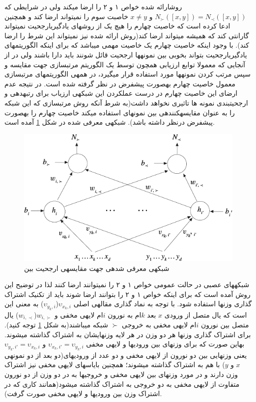 \documentclass{CSICC2016}
\renewcommand{\ }{\hspace{0em}}
\newcommand{\مق}{\lr}
\renewcommand{\یا}{یادگیری\ ارجحیت }
\newcommand{\یم}{یادگیری\ ماشین }
\renewcommand{\تر}{تابع رتبه\ بند }
\newcommand{\ار}{ارجحیت }
\renewcommand{\|}[1][.3em]{\hspace{#1}|\hspace{#1}}
\renewcommand{\,}[1][.3em]{,\hspace{#1}}
\newcommand{\outOne}{N_{\succ}}
\newcommand{\outTwo}{N_{\prec}}
\newcommand{\outOneXY}{\outOne([x,y])}
\newcommand{\outTwoXY}{\outTwo([x,y])}
\begin{document}
روش\ ارائه شده خواص ۱ و ۲ را ارضا می\ کند ولی در شرایطی که
$\outOneXY = \outTwoXY$ و $x \neq y$
خاصبت سوم را نمی\ تواند ارضا کند و همچنین ادعا کرده است که خاصیت چهارم را هیچ یک از روش\ های \یا نمی\ تواند گارانتی کند که همیشه می\ تواند ارضا کند(روش ارائه شده نیز نمی\ تواند این شرط را ارضا کند). با وجود اینکه خاصیت چهارم یک خاصیت مهمی می\ باشد که برای اینکه الگوریتم\ های \یا بتواند بخوبی بین نمونه\ ها ارجحیت قائل شونند باید دارا باشند ولی در از آن\ جایی که معمولا توابع ارزیابی همچون \مق{CmpNN} توسط یک الگوریتم مرتب\ سازی جهت مقایسه و سپس مرتب کردن نمونه\ ها مورد استفاده قرار می\ گیرد، در همه\ ی الگوریتم\ های مرتب\ سازی معمول خاصیت چهارم به\ صورت پیش\ فرض در نظر گرفته شده است. در نتیجه عدم ارضای این خاصیت چهارم در درست عمل\ کردن این شبکه\ ی ارزیاب برای رتبه\ دهی و ارجحیت\ بندی نمونه ها تاثیری نخواهد داشت(به شرط آن\ که روش مرتب\ سازی که این شبکه را به عنوان مقایسه\ کننده\ ی بین نمونه\ ای استفاده می\ کند خاصیت چهارم را به\ صورت پیش\ فرض درنظر داشته باشد).
شبکه\ ی \مق{CmpNN} معرفی شده در شکل
\ref{fig:cmpnn}
آمده است.
\begin{figure}
\centering
\includegraphics[width=.45\textwidth]{fig1}
\caption{شبکه\ ی معرفی شده\ ی \مق{CmpNN} جهت مقایسه\ ی ارجحیت بین \کادربی{نمونه\ ها}}\label{fig:cmpnn}
\end{figure}
شبکه\ های عصبی در حالت عمومی خواص ۱ و ۲ را نمی\ توانند ارضا کنند لذا در توضیح این روش آمده است که برای این\ که خواص ۱ و ۲ را بتوانند ارضا شوند باید از تکنیک اشتراک گذاری وزن\ ها استفاده شود. با توجه به نماد گذاری مقاله\ ی اصلی $\upsilon_{x_k, i}$($\upsilon_{y_k, i}$) به معنی این است که یال متصل از ورودی $x$ بعد $k$ام به نورون $i$ام لایه\ ی مخفی و $w_{i,\succ}$($w_{i,\prec}$) یال متصل بین نورون $i$ام لایه\ ی مخفی به خروجی $\succ$ شبکه می\ باشند(به شکل \ref{fig:cmpnn} توجه کنید).
برای اشتراک گذاری وزن\ ها هر دو وزن در هر لایه وزن\ هایشان به اشتراک گذاشته می\ شوند. به\ این صورت که برای وزن\ های بین ورودی\ ها و لایه\ ی مخفی
$\upsilon_{x_k, i'} = \upsilon_{y_k, i}$ و  $\upsilon_{y_k, i'} = \upsilon_{x_k, i}$
یعنی وزن\ هایی بین دو نورون از لایه\ ی مخفی و دو عدد از ورودی\ های(دو بعد از دو نمونه\ ی $x$ و $y$) با هم به اشتراک گذاشته می\ شوند؛ همچنین بایاس\ های لایه\ ی مخفی نیز اشتراک وزن دارند و در مورد وزن\ های بین لایه\ ی مخفی و خروجی\ ها به در دو وزن از دو نورون متفاوت از لایه\ ی مخفی به دو خروجی به اشتراک گذاشته می\ شود(همانند کاری که در اشتراک وزن بین ورودی\ ها و لایه\ ی مخفی صورت گرفت).
\end{document}
